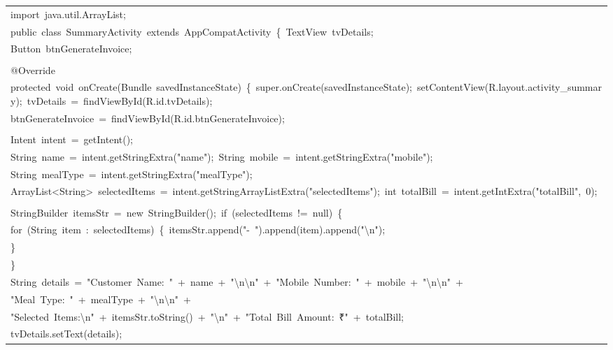 \documentclass[a4paper,12pt]{article}
\begin{document}
\begin{longtable}{|p{}|}
{\ttfamily\small import\ java.util.ArrayList;} \\
{\ttfamily\small public\ class\ SummaryActivity\ extends\ AppCompatActivity\ \{\ TextView\ tvDetails;} \\
{\ttfamily\small Button\ btnGenerateInvoice;} \\
\strut \\
{\ttfamily\small @Override} \\
{\ttfamily\small protected\ void\ onCreate(Bundle\ savedInstanceState)\ \{\ super.onCreate(savedInstanceState);\ setContentView(R.layout.activity\_summary);\ tvDetails\ =\ findViewById(R.id.tvDetails);} \\
{\ttfamily\small btnGenerateInvoice\ =\ findViewById(R.id.btnGenerateInvoice);} \\
\strut \\
{\ttfamily\small Intent\ intent\ =\ getIntent();} \\
{\ttfamily\small String\ name\ =\ intent.getStringExtra("name");\ String\ mobile\ =\ intent.getStringExtra("mobile");} \\
{\ttfamily\small String\ mealType\ =\ intent.getStringExtra("mealType");} \\
{\ttfamily\small ArrayList\textless{}String\textgreater{}\ selectedItems\ =\ intent.getStringArrayListExtra("selectedItems");\ int\ totalBill\ =\ intent.getIntExtra("totalBill",\ 0);} \\
\strut \\
{\ttfamily\small StringBuilder\ itemsStr\ =\ new\ StringBuilder();\ if\ (selectedItems\ !=\ null)\ \{} \\
{\ttfamily\small for\ (String\ item\ :\ selectedItems)\ \{\ itemsStr.append("-\ ").append(item).append("\textbackslash{}n");} \\
{\ttfamily\small \}} \\
{\ttfamily\small \}} \\
{\ttfamily\small String\ details\ =\ "Customer\ Name:\ "\ +\ name\ +\ "\textbackslash{}n\textbackslash{}n"\ +\ "Mobile\ Number:\ "\ +\ mobile\ +\ "\textbackslash{}n\textbackslash{}n"\ +} \\
{\ttfamily\small "Meal\ Type:\ "\ +\ mealType\ +\ "\textbackslash{}n\textbackslash{}n"\ +} \\
{\ttfamily\small "Selected\ Items:\textbackslash{}n"\ +\ itemsStr.toString()\ +\ "\textbackslash{}n"\ +\ "Total\ Bill\ Amount:\ ₹"\ +\ totalBill;} \\
{\ttfamily\small tvDetails.setText(details);} \\

\end{longtable}
\end{document}
